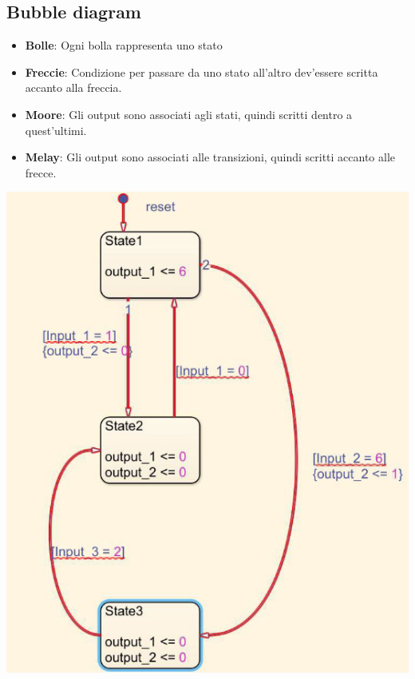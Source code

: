     \subsection{Bubble diagram}
        \begin{minipage} [t]{0.48\columnwidth}
            \vspace{0pt} %
            \begin{itemize}
                \item \textbf{Bolle}: Ogni bolla rappresenta uno stato
                \item \textbf{Freccie}: Condizione per passare da uno stato all'altro dev'essere scritta accanto alla freccia.
                \item \textbf{Moore}: Gli output sono associati agli stati, quindi scritti dentro a quest'ultimi.
                \item \textbf{Melay}: Gli output sono associati alle transizioni, quindi scritti accanto alle frecce.
            \end{itemize}
        \end{minipage}
        \begin{minipage} [t]{0.48\columnwidth}
            \vspace{0pt} %
            \includegraphics[width=\linewidth]{Images/BubbleDiagram.png}
        \end{minipage}
    


